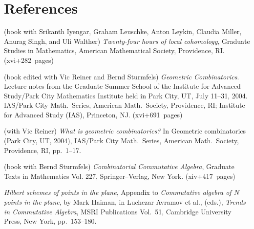 \documentclass[11pt]{proposal}
\def\bibsec#1{\item[#1]\vspace{.5ex}\item[]\vspace{-2.5ex}}
\def\bibsubsec#1{\item[\textsf{\hspace{-2.2ex}\textbf{#1}}]\vspace{.5ex}\item[]\vspace{-2.5ex}}
\def\bibyear#1{\makebox[-1ex][l]{}\marginpar[{\flushright{\small#1}}]{}}
\begin{document}
\section*{References}\label{s:refs}
\vspace{1.25ex}
\begin{thebibliography}{33}


\bibsec{\textbf{Publications and preprints by Ezra Miller}
(numbered as in~CV)}

\bibsubsec{\sf Books and expository articles}%

\bibyear{2007}
(book with Srikanth Iyengar, Graham Leuschke, Anton Leykin, Claudia
	Miller, Anurag Singh, and Uli Walther) \emph{Twenty-four hours
	of local cohomology}, Graduate Studies in Mathematics,
	American Mathematical Society, Providence, RI.
	(xvi+282~pages)

(book edited with Vic Reiner and Bernd Sturmfels) \emph{Geometric
	Combinatorics}.  Lecture notes from the Graduate Summer
	School of the Institute for Advanced Study/Park City
	Mathematics Institute held in Park City, UT, July 11--31,
	2004.  IAS/Park City Math.\ Series, American Math.\ Society,
	Providence, RI; Institute for Advanced Study (IAS), Princeton,
	NJ.  (xvi+691~pages)

(with Vic Reiner) \emph{What is geometric combinatorics?}  In Geometric
	combinatorics (Park City, UT, 2004), IAS/Park City Math.\
	Series, American Math.\ Society, Providence, RI, pp.~1--17.

\bibyear{2004}
(book with Bernd Sturmfels) \emph{Combinatorial Commutative Algebra},
	Graduate Texts in Mathematics Vol. 227, Springer--Verlag, New
	York.  (xiv+417~pages)

\emph{Hilbert schemes of points in the plane}, Appendix to
	\emph{Commutative algebra of $N$ points in the plane}, by
	Mark Haiman, in Luchezar Avramov
	et al., (eds.), \emph{Trends in Commutative Algebra}, MSRI
	Publications Vol.~51, Cambridge University Press, New York,
	pp.~153--180.


\end{thebibliography}
\end{document}
